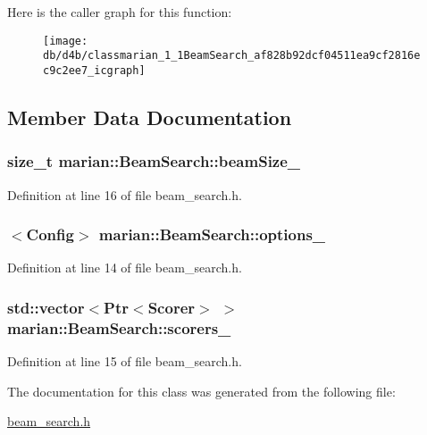 Here is the caller graph for this function\+:
\nopagebreak
\begin{figure}[H]
\begin{center}
\leavevmode
\texttt{[image: db/d4b/classmarian\_1\_1BeamSearch\_af828b92dcf04511ea9cf2816ec9c2ee7\_icgraph]}
\end{center}
\end{figure}




\subsection{Member Data Documentation}
\subsubsection[{\texorpdfstring{beam\+Size\+\_\+}{beamSize_}}]{\setlength{\rightskip}{0pt plus 5cm}size\+\_\+t marian\+::\+Beam\+Search\+::beam\+Size\+\_\+\hspace{0.3cm}{\ttfamily [private]}}\hypertarget{classmarian_1_1BeamSearch_ad8c2a3f3b25c4a40d3e79f242e11e963}{}\label{classmarian_1_1BeamSearch_ad8c2a3f3b25c4a40d3e79f242e11e963}


Definition at line 16 of file beam\+\_\+search.\+h.

\subsubsection[{\texorpdfstring{options\+\_\+}{options_}}]{$<${\bf Config}$>$ marian\+::\+Beam\+Search\+::options\+\_\+\hspace{0.3cm}{\ttfamily [private]}}\hypertarget{classmarian_1_1BeamSearch_a10153afbb751f39572a14bafb141225c}{}\label{classmarian_1_1BeamSearch_a10153afbb751f39572a14bafb141225c}


Definition at line 14 of file beam\+\_\+search.\+h.

\subsubsection[{\texorpdfstring{scorers\+\_\+}{scorers_}}]{\setlength{\rightskip}{0pt plus 5cm}std\+::vector$<${\bf Ptr}$<${\bf Scorer}$>$ $>$ marian\+::\+Beam\+Search\+::scorers\+\_\+\hspace{0.3cm}{\ttfamily [private]}}\hypertarget{classmarian_1_1BeamSearch_a1253640d2177b832316cb1343bb4db03}{}\label{classmarian_1_1BeamSearch_a1253640d2177b832316cb1343bb4db03}


Definition at line 15 of file beam\+\_\+search.\+h.



The documentation for this class was generated from the following file\+:\begin{DoxyCompactItemize}
\item 
\hyperlink{beam__search_8h}{beam\+\_\+search.\+h}\end{DoxyCompactItemize}
